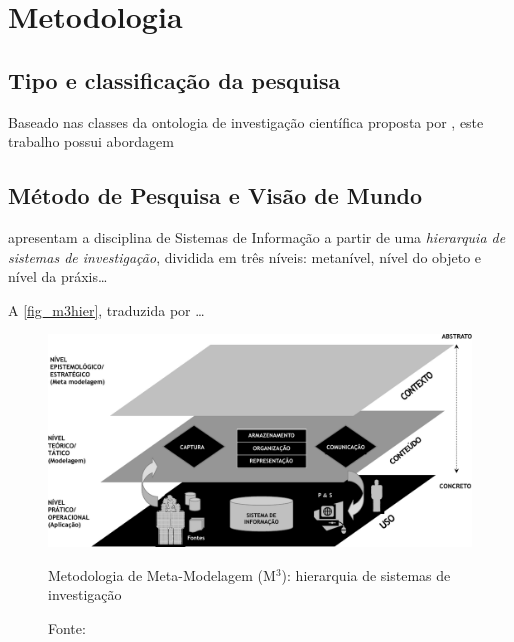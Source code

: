 %
%

\chapter{Metodologia}\label{metodologia}

\section{Tipo e classificação da pesquisa}

Baseado nas classes da ontologia de investigação científica
proposta por , este trabalho possui abordagem

\section{Método de Pesquisa e Visão de Mundo}

 apresentam a disciplina de Sistemas de Informação a
partir de uma \emph{hierarquia de sistemas de investigação}, dividida em três
níveis: metanível, nível do objeto e nível da práxis\ldots


A \autoref{fig_m3hier}, traduzida por \ldots
  
\begin{figure}[htb]
\begin{center}
    \includegraphics[scale=0.8]{imagens/fig_modeloAIMacedo.pdf}
  	\caption{\label{fig_m3hier}Metodologia de Meta-Modelagem (M{$^3$}):
  	hierarquia de sistemas de investigação}
  	\caption*{Fonte: } 
\end{center} 
\end{figure}

